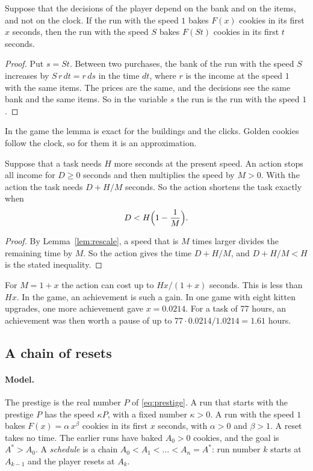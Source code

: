 \documentclass[11pt]{article}
\theoremstyle{boxed}
\begin{document}
\begin{lemma}\label{lem:rescale}
Suppose that the decisions of the player depend on the bank and on the items, and not on the
clock. If the run with the speed $1$ bakes $F(x)$ cookies in its first $x$ seconds, then the run
with the speed $S$ bakes $F(St)$ cookies in its first $t$ seconds.
\end{lemma}

\begin{proof}
Put $s=St$. Between two purchases, the bank of the run with the speed $S$ increases by
$S\,r\,dt=r\,ds$ in the time $dt$, where $r$ is the income at the speed $1$ with the same items.
The prices are the same, and the decisions see the same bank and the same items. So in the
variable $s$ the run is the run with the speed $1$.
\end{proof}

In the game the lemma is exact for the buildings and the clicks. Golden cookies follow the
clock, so for them it is an approximation.

\begin{proposition}\label{prop:pause}
Suppose that a task needs $H$ more seconds at the present speed. An action stops all income for
$D\ge0$ seconds and then multiplies the speed by $M>0$. With the action the task needs $D+H/M$
seconds. So the action shortens the task exactly when
\[
  D<H\Bigl(1-\frac1M\Bigr).
\]
\end{proposition}

\begin{proof}
By Lemma~\ref{lem:rescale}, a speed that is $M$ times larger divides the remaining time by $M$.
So the action gives the time $D+H/M$, and $D+H/M<H$ is the stated inequality.
\end{proof}

For $M=1+x$ the action can cost up to $Hx/(1+x)$ seconds. This is less than $Hx$. In the game,
an achievement is such a gain. In one game with eight kitten upgrades, one more achievement gave
$x=0.0214$. For a task of 77 hours, an achievement was then worth a pause of up to
$77\cdot0.0214/1.0214=1.61$ hours.

\subsection{A chain of resets}

\paragraph{Model.} The prestige is the real number $P$ of \eqref{eq:prestige}. A run that
starts with the prestige $P$ has the speed $\kappa P$, with a fixed number $\kappa>0$. A run
with the speed $1$ bakes $F(x)=\alpha\,x^{\beta}$ cookies in its first $x$ seconds, with
$\alpha>0$ and $\beta>1$. A reset takes no time. The earlier runs have baked $A_0>0$ cookies, and the goal is
$A^{\ast}>A_0$. A \emph{schedule} is a chain
$A_0<A_1<\dots<A_n=A^{\ast}$: run number $k$ starts at $A_{k-1}$ and the player resets at $A_k$.
\end{document}
